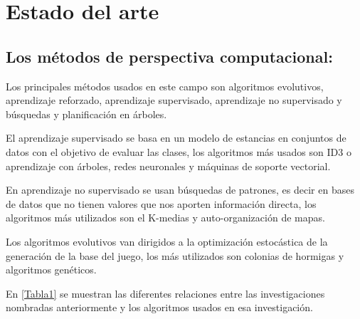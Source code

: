 \chapter[Estado del arte]{\label{identificadorReferenciaCruzada}
Estado del arte}

\section{Los métodos de perspectiva computacional:}

Los principales métodos usados en este campo son algoritmos evolutivos, aprendizaje reforzado, aprendizaje supervisado, aprendizaje no supervisado y búsquedas y planificación en árboles.

El aprendizaje supervisado se basa en un modelo de estancias en conjuntos de datos con el objetivo de evaluar las clases, los algoritmos más usados son ID3 o aprendizaje con árboles, redes neuronales y máquinas de soporte vectorial.
	
En aprendizaje no supervisado se usan búsquedas de patrones, es decir en bases de datos que no tienen valores que nos aporten información directa, los algoritmos más utilizados son el K-medias y auto-organización de mapas.

Los algoritmos evolutivos van dirigidos a la optimización estocástica de la generación de la base del juego, los más utilizados son colonias de hormigas y algoritmos genéticos.

En \ref{Tabla1} se muestran las diferentes relaciones entre las investigaciones nombradas anteriormente y los algoritmos usados en esa investigación\cite{B1}.


